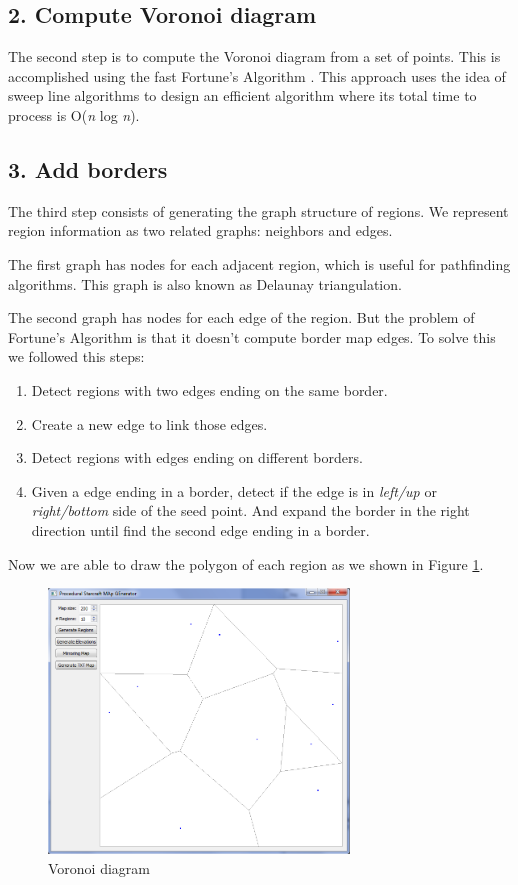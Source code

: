 \documentclass[letterpaper]{article}
\begin{document}
\subsection{2. Compute Voronoi diagram}
The second step is to compute the Voronoi diagram from a set of points. This is accomplished using the fast Fortune's Algorithm \cite{Fortune}. This approach uses the idea of sweep line algorithms to design an efficient algorithm where its total time to process is O(\emph{n} log \emph{n}).

\subsection{3. Add borders}
The third step consists of generating the graph structure of regions. We represent region information as two related graphs: neighbors and edges.

The first graph has nodes for each adjacent region, which is useful for pathfinding algorithms. This graph is also known as Delaunay triangulation.

The second graph has nodes for each edge of the region. But the problem of Fortune's Algorithm is that it doesn't compute border map edges. To solve this we followed this steps:
\begin{enumerate}
	\item Detect regions with two edges ending on the same border.
	\item Create a new edge to link those edges.
	\item Detect regions with edges ending on different borders.
	\item Given a edge ending in a border, detect if the edge is in \emph{left/up} or \emph{right/bottom} side of the seed point. And expand the border in the right direction until find the second edge ending in a border.
\end{enumerate}
Now we are able to draw the polygon of each region as we shown in Figure \ref{fig:voronoi-diagram}.

\begin{figure}[ht]
    \centering
    \includegraphics[width=8cm]{PCG02.png}
    \caption{Voronoi diagram}
    \label{fig:voronoi-diagram}
\end{figure}
\end{document}
